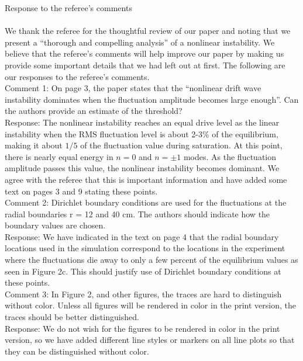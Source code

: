 \documentclass[12pt]{article}
\begin{document}
Response to the referee's comments \\ \\ 

We thank the referee for the thoughtful review of our paper and noting that we present a ``thorough and compelling analysis'' of a nonlinear instability. We believe that the referee's comments will help
improve our paper by making us provide some important details that we had left out at first. The following are our responses to the referee's comments. \\

Comment 1:   On page 3, the paper states that the “nonlinear drift wave instability dominates when
the fluctuation amplitude becomes large enough”. Can the authors provide an estimate of the threshold? \\

Response: The nonlinear instability reaches an equal drive level as the linear instability when the RMS fluctuation level is about 2-3$\%$ of the equilibrium, making it about $1/5$ 
of the fluctuation value during saturation. At this point, there is nearly equal energy in $n=0$ and $n= \pm 1$ modes. 
As the fluctuation amplitude passes this value, the nonlinear instability becomes dominant. We agree with the referee that this is important information and
have added some text on pages 3 and 9 stating these points. \\


Comment 2:    Dirichlet boundary conditions are used for the fluctuations at the radial boundaries r = 12 and 40 cm. The authors should indicate how the boundary values are chosen. \\

Response: We have indicated in the text on page 4 that the radial boundary locations used in the simulation correspond to the locations in the experiment where the fluctuations die away to only
a few percent of the equilibrium values as seen in Figure 2c. This should justify use of Dirichlet boundary conditions at these points. \\

Comment 3:  In Figure 2, and other figures, the traces are hard to distinguish without color. Unless all figures will be rendered in color in the print version, the traces should be better
distinguished. \\

Response: We do not wish for the figures to be rendered in color in the print version, so we have added different line styles or markers on all line plots so that they can be 
distinguished without color. \\
\end{document}
